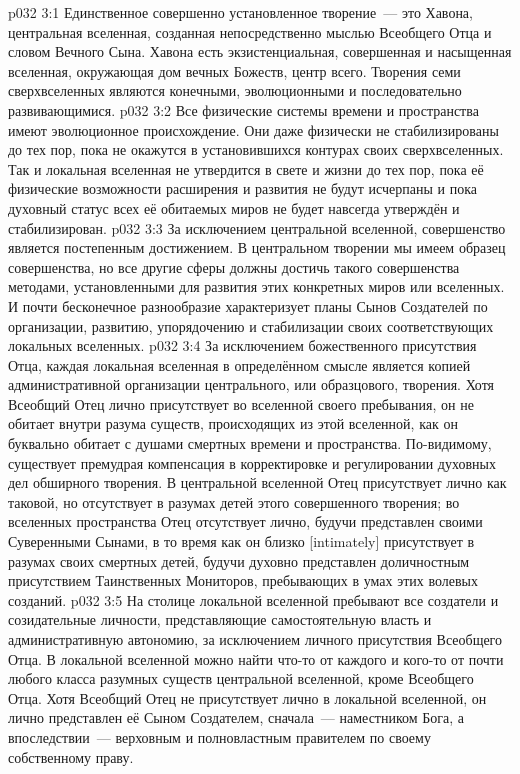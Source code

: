 \vs p032 3:1 Единственное совершенно установленное творение~--- это Хавона, центральная вселенная, созданная непосредственно мыслью Всеобщего Отца и словом Вечного Сына. Хавона есть экзистенциальная, совершенная и насыщенная вселенная, окружающая дом вечных Божеств, центр всего. Творения семи сверхвселенных являются конечными, эволюционными и последовательно развивающимися.
\vs p032 3:2 Все физические системы времени и пространства имеют эволюционное происхождение. Они даже физически не стабилизированы до тех пор, пока не окажутся в установившихся контурах своих сверхвселенных. Так и локальная вселенная не утвердится в свете и жизни до тех пор, пока её физические возможности расширения и развития не будут исчерпаны и пока духовный статус всех её обитаемых миров не будет навсегда утверждён и стабилизирован.
\vs p032 3:3 За исключением центральной вселенной, совершенство является постепенным достижением. В центральном творении мы имеем образец совершенства, но все другие сферы должны достичь такого совершенства методами, установленными для развития этих конкретных миров или вселенных. И почти бесконечное разнообразие характеризует планы Сынов Создателей по организации, развитию, упорядочению и стабилизации своих соответствующих локальных вселенных.
\vs p032 3:4 \pc За исключением божественного присутствия Отца, каждая локальная вселенная в определённом смысле является копией административной организации центрального, или образцового, творения. Хотя Всеобщий Отец лично присутствует во вселенной своего пребывания, он не обитает внутри разума существ, происходящих из этой вселенной, как он буквально обитает с душами смертных времени и пространства. По\hyp{}видимому, существует премудрая компенсация в корректировке и регулировании духовных дел обширного творения. В центральной вселенной Отец присутствует лично как таковой, но отсутствует в разумах детей этого совершенного творения; во вселенных пространства Отец отсутствует лично, будучи представлен своими Суверенными Сынами, в то время как он близко [intimately] присутствует в разумах своих смертных детей, будучи духовно представлен доличностным присутствием Таинственных Мониторов, пребывающих в умах этих волевых созданий.
\vs p032 3:5 На столице локальной вселенной пребывают все создатели и созидательные личности, представляющие самостоятельную власть и административную автономию, за исключением личного присутствия Всеобщего Отца. В локальной вселенной можно найти что-то от каждого и кого-то от почти любого класса разумных существ центральной вселенной, кроме Всеобщего Отца. Хотя Всеобщий Отец не присутствует лично в локальной вселенной, он лично представлен её Сыном Создателем, сначала~--- наместником Бога, а впоследствии~--- верховным и полновластным правителем по своему собственному праву.
